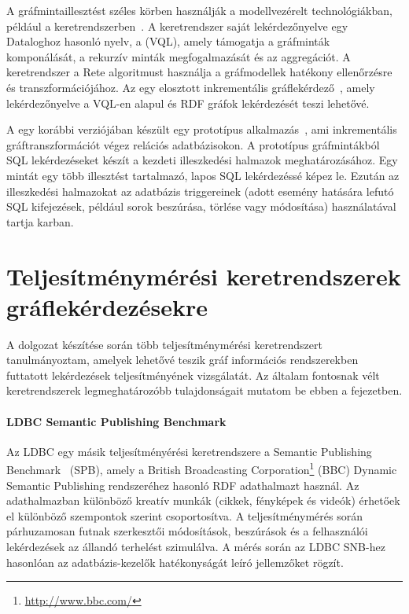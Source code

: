 A gráfmintaillesztést széles körben használják a modellvezérelt technológiákban, például a \viatra keretrendszerben~\cite{DBLP:journals/sosym/VarroBHHRU16}. A keretrendszer saját lekérdezőnyelve egy Dataloghoz hasonló nyelv, a \vql (VQL), amely támogatja a gráfminták komponálását, a rekurzív minták megfogalmazását és az aggregációt. A \viatra keretrendszer a Rete algoritmust használja a gráfmodellek hatékony ellenőrzésre és transzformációjához. Az \iqd egy elosztott inkrementális gráflekérdező~\cite{DBLP:conf/models/SzarnyasIRHBV14}, amely lekérdezőnyelve a VQL-en alapul és RDF gráfok lekérdezését teszi lehetővé.

A \viatra egy korábbi verziójában készült egy prototípus alkalmazás~\cite{DBLP:conf/gg/BergmannHH12}, ami inkrementális gráftranszformációt végez relációs adatbázisokon. A prototípus  gráfmintákból SQL lekérdezéseket készít a kezdeti illeszkedési halmazok meghatározásához. Egy mintát egy több illesztést tartalmazó, lapos SQL lekérdezéssé képez le. Ezután az illeszkedési halmazokat az adatbázis triggereinek (adott esemény hatására lefutó SQL kifejezések, például sorok beszúrása, törlése vagy módosítása) használatával tartja karban.



\section{Teljesítménymérési keretrendszerek gráflekérdezésekre}

A dolgozat készítése során több teljesítménymérési keretrendszert tanulmányoztam, amelyek lehetővé teszik gráf információs rendszerekben futtatott lekérdezések teljesítményének vizsgálatát. Az általam fontosnak vélt keretrendszerek legmeghatározóbb tulajdonságait mutatom be ebben a fejezetben.

\paragraph{LDBC Semantic Publishing Benchmark}
Az LDBC egy másik teljesítményérési keretrendszere a Semantic Publishing Benchmark~\cite{DBLP:conf/semweb/KotsevMPEFK16} (SPB), amely a British Broadcasting Corporation\footnote{\url{http://www.bbc.com/}} (BBC)  Dynamic Semantic Publishing rendszeréhez hasonló RDF adathalmazt használ. Az adathalmazban különböző kreatív munkák (cikkek, fényképek és videók) érhetőek el különböző szempontok szerint csoportosítva. A teljesítménymérés során párhuzamosan futnak szerkesztői módosítások, beszúrások és a felhasználói lekérdezések az állandó terhelést szimulálva. A mérés során az LDBC SNB-hez hasonlóan az adatbázis-kezelők hatékonyságát leíró jellemzőket rögzít.

